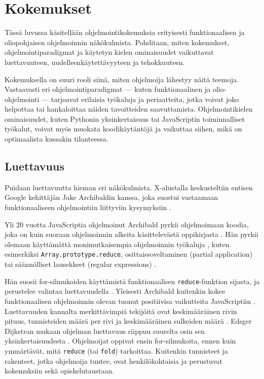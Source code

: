 \clearpage%
\vspace{21.5pt}
\chapter{Kokemukset}

Tässä luvussa käsitellään ohjelmointikokemuksia erityisesti funktionaalisen ja oliopohjaisen ohjelmoinnin näkökulmista. Pohditaan, miten kokemukset, ohjelmointiparadigmat ja käytetyn kielen ominaisuudet vaikuttavat luettavuuteen, uudelleenkäytettävyyteen ja tehokkuuteen.

Kokemuksella on suuri rooli siinä, miten ohjelmoija lähestyy näitä teemoja. Vastaavasti eri ohjelmointiparadigmat — kuten funktionaalinen ja olio-ohjelmointi — tarjoavat erilaisia työkaluja ja periaatteita, jotka voivat joko helpottaa tai hankaloittaa näiden tavoitteiden saavuttamista. Ohjelmointikielen ominaisuudet, kuten Pythonin yksinkertaisuus tai JavaScriptin toiminnalliset työkalut, voivat myös muokata koodikäytäntöjä ja vaikuttaa siihen, mikä on optimaalista kussakin tilanteessa.

\section{Luettavuus}

Puidaan luettavuutta hieman eri näkökulmista. X-alustalla keskusteltiin entisen Google kehittäjän Jake Archibaldin kanssa, joka suostui vastaamaan funktionaaliseen ohjelmointiin liittyviin kysymyksiin \cite{pennane_x_convo}.

Yli 20 vuotta JavaScriptia ohjelmoinut Archibald pyrkii ohjelmoimaan koodia, joka on kuin suoraan ohjelmoinnin alkeita käsittelevästä oppikirjasta \cite{is_reduce_bad,pennane_fp_gist}. Hän pyrkii olemaan käyttämättä monimutkaisempia ohjelmoinnin työkaluja \cite{is_reduce_bad}, kuten esimerkiksi \texttt{Array.prototype.reduce}, osittaissoveltaminen (partial application) tai säännölliset lausekkeet (regular expressions) \cite{is_reduce_bad,pennane_x_convo}.

Hän suosii for-silmukoiden käyttämistä funktionaalisen \texttt{reduce}-funktion sijasta, ja perustelee valintaa luettavuudella \cite{is_reduce_bad,pennane_x_convo,pennane_fp_gist}. Yleisesti Archibald kuitenkin kokee funktionaalisen ohjelmoinnin olevan tuonut positiivisa vaikutteita JavaScriptiin \cite{pennane_x_convo}. Luettavuuden kannalta merkittävimpiä tekijöitä ovat keskimääräinen rivin pituus, tunnisteiden määrä per rivi ja keskimääräinen sulkeiden määrä \cite[8]{busereadability}. Edsger Dijkstran mukaan ohjelman luettavuus riippuu suurelta osin sen  yksinkertaisuudesta \cite{dijkstra1976discipline}. Ohjelmoijat oppivat ensin for-silmukoita, ennen kuin ymmärtävät, mitä \texttt{reduce} (tai \texttt{fold}) tarkoittaa. Kuitenkin tunnisteet ja rakenteet, jotka ohjelmoija tuntee, ovat henkilökohtaisia ja perustuvat kokemuksiin sekä opiskelutaustaan.

